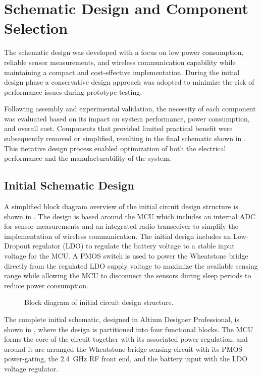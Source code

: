 \section{Schematic Design and Component Selection}
The schematic design was developed with a focus on low power consumption, reliable sensor measurements, and wireless communication capability while maintaining a compact and cost-effective implementation. During the initial design phase a conservative design approach was adopted to minimize the risk of performance issues during prototype testing.

Following assembly and experimental validation, the necessity of each component was evaluated based on its impact on system performance, power consumption, and overall cost. Components that provided limited practical benefit were subsequently removed or simplified, resulting in the final schematic shown in . This iterative design process enabled optimization of both the electrical performance and the manufacturability of the system.

\subsection{Initial Schematic Design}
A simplified block diagram overview of the initial circuit design structure is shown in . The design is based around the MCU which includes an internal ADC for sensor measurements and an integrated radio transceiver to simplify the implementation of wireless communication. The initial design includes an Low-Dropout regulator (LDO) to regulate the battery voltage to a stable input voltage for the MCU. A PMOS switch is used to power the Wheatstone bridge directly from the regulated LDO supply voltage to maximize the available sensing range while allowing the MCU to disconnect the sensors during sleep periods to reduce power consumption.

\begin{figure}
\centering

    \caption{Block diagram of initial circuit design structure.}
    \label{fig:circuit_block}
\end{figure}

The complete initial schematic, designed in Altium Designer Professional, is shown in , where the design is partitioned into four functional blocks. The MCU forms the core of the circuit together with its associated power regulation, and around it are arranged the Wheatstone bridge sensing circuit with its PMOS power-gating, the \SI{2.4}{\giga\hertz} RF front end, and the battery input with the LDO voltage regulator.

